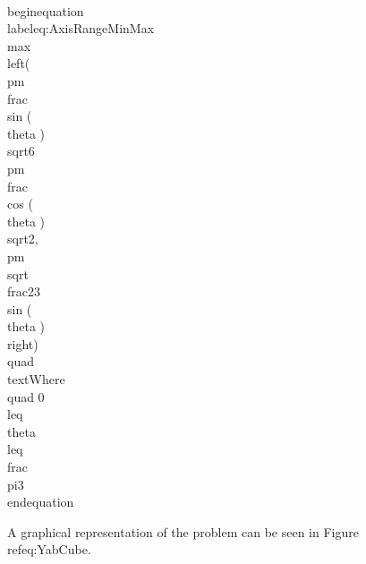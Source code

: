 \\begin{equation}\\label{eq:AxisRangeMinMax}
 \\max\\left(\\pm\\frac{\\sin (\\theta )}{\\sqrt{6}}\\pm\\frac{\\cos (\\theta )}{\\sqrt{2}}, \\pm\\sqrt{\\frac{2}{3}} \\sin (\\theta ) \\right) \\quad \\text{Where} \\quad 0\\leq \\theta \\leq \\frac{\\pi}{3}
\\end{equation}

A graphical representation of the problem can be seen in Figure~\\ref{eq:YabCube}.

